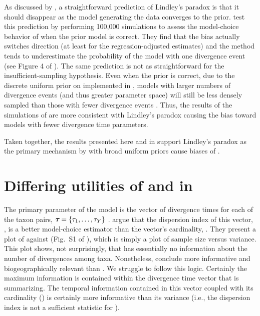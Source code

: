 \documentclass[letterpaper,12pt]{article}
\begin{document}
\begin{linenumbers}
As discussed by \citet{Oaks2012}, a straightforward prediction of Lindley's
paradox is that it should disappear as the model generating the data converges
to the prior.
\citet{Oaks2012} test this prediction by performing 100,000 simulations to
assess the model-choice behavior of \msb when the prior model is correct.
They find that the bias actually switches direction (at least for the
regression-adjusted estimates) and the method tends to underestimate the
probability of the model with one divergence event (see Figure 4 of
\citet{Oaks2012}).
The same prediction is not as straightforward for the insufficient-sampling
hypothesis.
Even when the prior is correct, due to the discrete uniform prior on
\numt{} implemented in \msb, models with larger numbers of divergence
events (and thus greater parameter space) will still be less densely
sampled than those with fewer divergence events \citep{Oaks2012}.
Thus, the results of the simulations of \citet{Oaks2012} are more consistent
with Lindley's paradox causing the bias toward models with fewer divergence
time parameters.

Taken together, the results presented here and in \citet{Oaks2012} support
Lindley's paradox as the primary mechanism by with broad uniform priors
cause biases of \msb.




\section*{Differing utilities of \numt{} and \vmratio{} in \msb}
The primary parameter of the \msb model is the vector of divergence
times for each of the taxon pairs,
$\boldsymbol{\tau_{}} = \{\tau_{1}, \ldots, \tau_{Y}\}$
\citep{Oaks2012}.
\citet{Hickerson2013} argue that the dispersion index of this vector,
\vmratio{}, is a better model-choice estimator than the vector's cardinality,
\numt{}.
They present a plot of \numt{} against \vmratio{} (Fig.~S1 of
\citet{Hickerson2013}), which is simply a plot of sample size versus variance.
This plot shows, not surprisingly, that \vmratio{} has essentially no
information about the number of divergences among taxa.
Nonetheless, \citet{Hickerson2013} conclude \vmratio{} more informative and
biogeographically relevant than \numt{}.
We struggle to follow this logic.
Certainly the maximum information is contained within the divergence time
vector that \vmratio{} is summarizing.
The temporal information contained in this vector coupled with its cardinality
(\numt{}) is certainly more informative than its variance (i.e., the dispersion
index is not a sufficient statistic for \divtvector).


\end{linenumbers}
\end{document}
